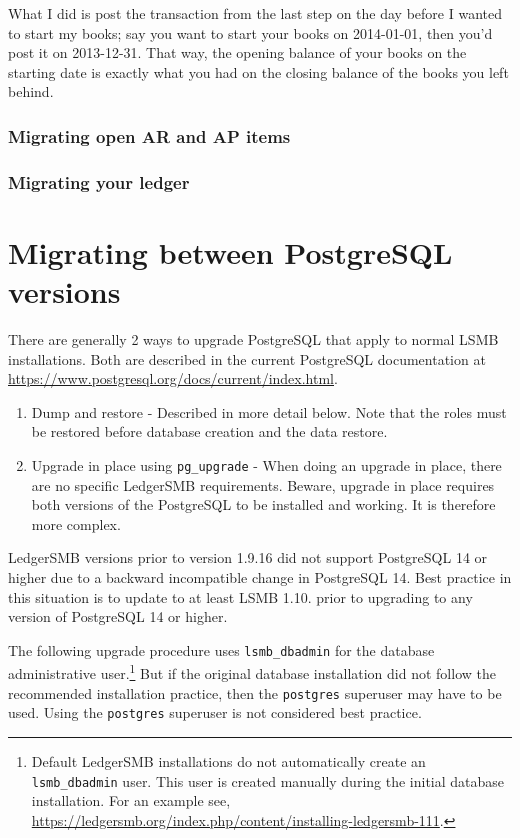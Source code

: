 What I did is post the transaction from the last step on the day before I wanted to start my books; say you want to start your books on 2014-01-01, then you'd post it on 2013-12-31. That way, the opening balance of your books on the starting date is exactly what you had on the closing balance of the books you left behind.

\subsubsection{Migrating open AR and AP items}
\label{subsec-migration-others-open-items}

\subsubsection{Migrating your ledger}
\label{subsec-migration-others-ledger}

\section{Migrating between PostgreSQL versions}
\label{sec-migration-postrgesql}

There are generally 2 ways to upgrade PostgreSQL that apply to normal LSMB installations. 
Both are described in the current PostgreSQL documentation at \url{https://www.postgresql.org/docs/current/index.html}.
\begin{enumerate}
    \item Dump and restore -
        Described in more detail below.
        Note that the roles must be restored before database creation and the data restore.
    \item Upgrade in place using \texttt{pg\_upgrade} - When doing an upgrade in place, there are no specific LedgerSMB requirements.
        Beware, upgrade in place requires both versions of the PostgreSQL to be installed and working. It is therefore more complex.
\end{enumerate}

LedgerSMB versions prior to version 1.9.16 did not support PostgreSQL 14 or higher due to a backward incompatible change in PostgreSQL 14.
Best practice in this situation is to update to at least LSMB 1.10. prior to upgrading to any version of PostgreSQL 14 or higher.

The following upgrade procedure uses \texttt{lsmb\_dbadmin} for the database administrative user.\footnote{Default LedgerSMB installations do not automatically create an  \texttt{lsmb\_dbadmin} user. This user is created manually during the initial database installation. For an example see, \url{https://ledgersmb.org/index.php/content/installing-ledgersmb-111}.}
But if the original database installation did not follow the recommended installation practice, then the \texttt{postgres} superuser may have to be used. Using the \texttt{postgres} superuser is not considered best practice.

